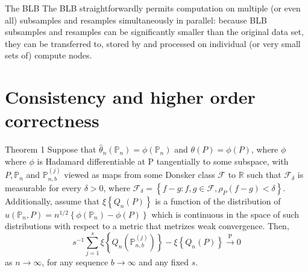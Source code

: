 \documentclass[12pt]{beamer}
\begin{document}
\begin{frame}{The BLB}
The BLB straightforwardly permits computation on multiple (or even all) subsamples
and resamples simultaneously in parallel: because BLB subsamples and resamples can
be significantly smaller than the original data set, they can be transferred to, stored by and
processed on individual (or very small sets of) compute nodes.
\end{frame}

\section{Consistency and higher order correctness}
\begin{frame}{Theorem 1}
Suppose that $\hat{\theta}_{n}\left(\mathbb{P}_{n}\right)=\phi\left(\mathbb{P}_{n}\right)$ and $\theta(P)=\phi(P)$, where $\phi$ where $\phi$ is Hadamard differentiable
at P tangentially to some subspace, with $P,\mathbb{P}_n$ and $\mathbb{P}_{n,b}^{(j)}$ viewed as maps from some Donsker
class $\mathcal{F}$ to $\mathbb{R}$ such that $\mathcal{F}_{\delta}$ is measurable for every $\delta>0$, where $\mathcal{F}_{\delta}=\left\{f-g: f, g \in \mathcal{F}, \rho_{P}(f-g)<\delta\right\}$. Additionally, assume that $\xi\left\{Q_{n}(P)\right\}$ is a function of
the distribution of $u\left(\mathbb{P}_{n}, P\right)=n^{1 / 2}\left\{\phi\left(\mathbb{P}_{n}\right)-\phi(P)\right\}$ which is continuous in the space of such
distributions with respect to a metric that metrizes weak convergence. Then,
$$
s^{-1} \sum_{j=1}^{s} \xi\left\{Q_{n}\left(\mathbb{P}_{n, b}^{(j)}\right)\right\}-\xi\left\{Q_{n}(P)\right\} \stackrel{\mathrm{P}}{\rightarrow} 0
$$
as $n \to \infty$, for any sequence $b \to \infty$  and any fixed $s$.
\end{frame}
\end{document}
